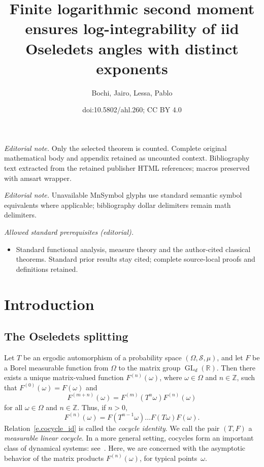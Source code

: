 \documentclass[10pt]{amsart}
\title{Finite logarithmic second moment ensures log-integrability of iid Oseledets angles with distinct exponents}
\author{Bochi, Jairo, Lessa, Pablo}
\date{doi:10.5802/ahl.260; CC BY 4.0}
\theoremstyle{definition}\newtheorem{defi}[theo]{Definition}\newtheorem{rema}[theo]{Remark}\newtheorem{exam}[theo]{Example}\newtheorem{exem}[theo]{Example}\newtheorem{nota}[theo]{Notation}
\newcommand{\Z}{\mathbb{Z}}
\newcommand{\R}{\mathbb{R}}
\newcommand{\clS}{\mathcal{S}}
\DeclareMathOperator{\GL}{GL}
\begin{document}
\maketitle
\noindent\textit{Editorial note.} Only the selected theorem is counted. Complete original mathematical body and appendix retained as uncounted context. Bibliography text extracted from the retained publisher HTML references; macros preserved with amsart wrapper.\par\medskip
\noindent\textit{Editorial note.} Unavailable MnSymbol glyphs use standard semantic symbol equivalents where applicable; bibliography dollar delimiters remain math delimiters.\par\medskip
\noindent\textit{Allowed standard prerequisites (editorial).}\begin{itemize}
\item Standard functional analysis, measure theory and the author-cited classical theorems. Standard prior results stay cited; complete source-local proofs and definitions retained.
\end{itemize}\medskip

\section{Introduction}

\subsection{The Oseledets splitting}

Let $T$ be an ergodic automorphism of a probability space $(\Omega,\clS,\mu)$, and let $F$ be a Borel measurable function from $\Omega$ to the matrix group $\GL_d(\R)$. Then there exists a unique matrix-valued function $F^{(n)}(\omega)$, where $\omega \in \Omega$ and $n \in \Z$, such that $F^{(0)}(\omega) = F(\omega)$ and
\begin{equation}\label{e.cocycle_id}
F^{(m+n)}(\omega) = F^{(m)}(T^n \omega) F^{(n)}(\omega)
\end{equation}
for all $\omega \in \Omega$ and $n \in \Z$. Thus, if $n > 0$,
\begin{equation}
F^{(n)}(\omega) = F\left(T^{n-1} \omega\right)\dots F(T\omega) F(\omega).
\end{equation}
Relation~\eqref{e.cocycle_id} is called the \emph{cocycle identity}. We call the pair $(T,F)$ a \emph{measurable linear cocycle}. In a more general setting, cocycles form an important class of dynamical systems: see~\cite[Section~1.3.k]{HK}. Here, we are concerned with the asymptotic behavior of the matrix products $F^{(n)}(\omega)$, for typical points~$\omega$.
\end{document}
